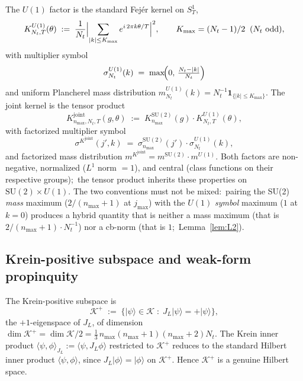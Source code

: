 \documentclass[11pt,a4paper]{article}
\theoremstyle{plain}
\theoremstyle{definition}
\newcommand{\nmax}{n_{\max}}
\newcommand{\Nt}{N_{t}}
\newcommand{\Kmax}{K_{\max}}
\newcommand{\SoneT}{S^{1}_{T}}
\newcommand{\Krein}{\mathcal{K}}
\newcommand{\SU}{\mathrm{SU}}
\newcommand{\Uone}{U(1)}
\newcommand{\JL}{J_{L}}
\newcommand{\Kjoint}{K^{\mathrm{joint}}}
\newcommand{\KSU}{K^{\SU(2)}}
\newcommand{\KU}{K^{\Uone}}
\newcommand{\Kplus}{\Krein^{+}}
\begin{document}
The $\Uone$ factor is the standard Fej\'er kernel on $\SoneT$,
\begin{equation}\label{eq:K_U1_def}
   \KU_{\Nt, T}(\theta) \;:=\; \frac{1}{\Nt}
   \Bigl|\sum_{|k| \le \Kmax} e^{i \, 2\pi k\theta / T}\Bigr|^{2},
   \qquad \Kmax = (\Nt - 1)/2 \;\; (\Nt \text{ odd}),
\end{equation}
with multiplier symbol
\begin{equation}\label{eq:K_U1_plancherel}
   \sigma^{\Uone}_{\Nt}(k) \;=\;
   \max\!\Bigl(0,\, \tfrac{\Nt - |k|}{\Nt}\Bigr)
\end{equation}
and uniform
Plancherel mass distribution $m^{\Uone}_{\Nt}(k) = \Nt^{-1}
\mathbf{1}_{\{|k| \le \Kmax\}}$. The joint kernel is the tensor
product
\begin{equation}\label{eq:K_joint_def}
   \Kjoint_{\nmax,\Nt,T}(g, \theta)
   \;:=\; \KSU_{\nmax}(g) \cdot \KU_{\Nt, T}(\theta),
\end{equation}
with factorized multiplier symbol
\begin{equation}\label{eq:K_joint_plancherel}
   \sigma^{\Kjoint}(j', k)
   \;=\; \sigma^{\SU(2)}_{\nmax}(j') \cdot
         \sigma^{\Uone}_{\Nt}(k),
\end{equation}
and factorized mass distribution $m^{\Kjoint} = m^{\SU(2)} \cdot
m^{\Uone}$. Both factors are non-negative, normalized ($L^{1}$ norm
$= 1$), and central (class functions on their respective groups);\
the tensor product inherits these properties on $\SU(2) \times \Uone$.
The two conventions must not be mixed:\ pairing the SU(2)
\emph{mass} maximum ($2/(\nmax+1)$ at $j_{\max}$) with the $\Uone$
\emph{symbol} maximum ($1$ at $k = 0$) produces a hybrid quantity
that is neither a mass maximum (that is
$2/(\nmax+1) \cdot \Nt^{-1}$) nor a cb-norm (that is $1$;\
Lemma~\ref{lem:L2}).

\subsection{Krein-positive subspace and weak-form propinquity}
\label{sec:Kplus_definition}

The Krein-positive subspace is
\begin{equation}\label{eq:Kplus_def}
   \Kplus \;:=\; \{|\psi\rangle \in \Krein \;:\;
                  \JL|\psi\rangle = +|\psi\rangle\},
\end{equation}
the $+1$-eigenspace of $\JL$, of dimension
$\dim\Kplus = \dim\Krein / 2 = \tfrac{1}{3}\,\nmax(\nmax+1)(\nmax+2)\Nt$.
The Krein inner product
$\langle \psi, \phi \rangle_{\JL} := \langle \psi, \JL \phi\rangle$
restricted to $\Kplus$ reduces to the standard Hilbert inner product
$\langle \psi, \phi\rangle$, since $\JL|\phi\rangle = |\phi\rangle$ on
$\Kplus$. Hence $\Kplus$ is a genuine Hilbert space.
\end{document}
